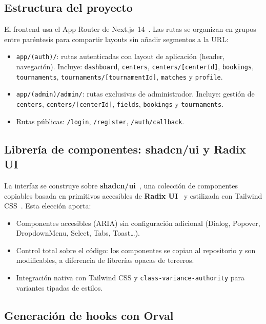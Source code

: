 \subsection{Estructura del proyecto}

El frontend usa el App Router de Next.js~14~\cite{nextjs}. Las rutas se organizan en grupos
entre paréntesis para compartir layouts sin añadir segmentos a la URL:

\begin{itemize}
  \item \texttt{app/(auth)/}: rutas autenticadas con layout de aplicación
    (header, navegación). Incluye: \texttt{dashboard}, \texttt{centers},
    \texttt{centers/[centerId]}, \texttt{bookings}, \texttt{tournaments},
    \texttt{tournaments/[tournamentId]}, \texttt{matches} y \texttt{profile}.
  \item \texttt{app/(admin)/admin/}: rutas exclusivas de administrador.
    Incluye: gestión de \texttt{centers}, \texttt{centers/[centerId]},
    \texttt{fields}, \texttt{bookings} y \texttt{tournaments}.
  \item Rutas públicas: \texttt{/login}, \texttt{/register},
    \texttt{/auth/callback}.
\end{itemize}

\subsection{Librería de componentes: shadcn/ui y Radix UI}

La interfaz se construye sobre \textbf{shadcn/ui}~\cite{shadcnui}, una colección
de componentes copiables basada en primitivos accesibles de \textbf{Radix UI}~\cite{radixui} y estilizada con
Tailwind CSS~\cite{tailwind}. Esta elección aporta:

\begin{itemize}
  \item Componentes accesibles (ARIA) sin configuración adicional
    (Dialog, Popover, DropdownMenu, Select, Tabs, Toast\ldots).
  \item Control total sobre el código: los componentes se copian al repositorio
    y son modificables, a diferencia de librerías opacas de terceros.
  \item Integración nativa con Tailwind CSS y \texttt{class-variance-authority}
    para variantes tipadas de estilos.
\end{itemize}

\subsection{Generación de hooks con Orval}

